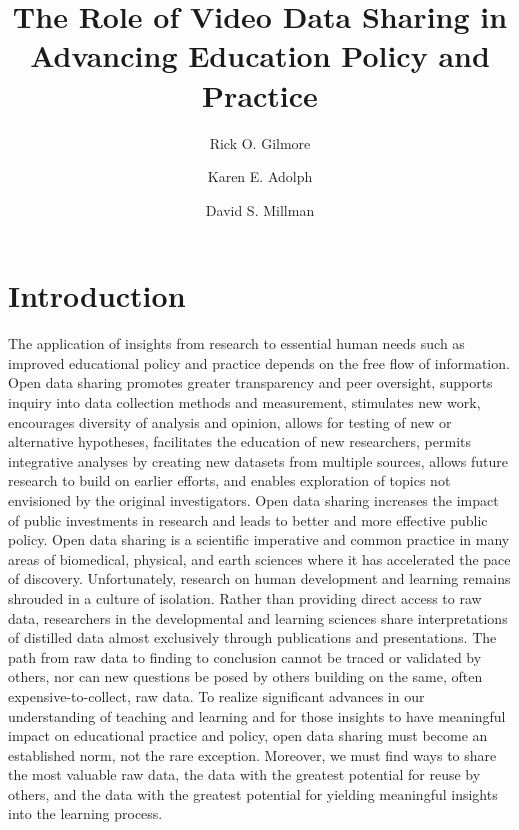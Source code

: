 \documentclass[letterpaper,man,natbib]{apa6}
\title{The Role of Video Data Sharing in Advancing Education Policy and Practice}
\author{Rick O. Gilmore}
\author{Karen E. Adolph}
\author{David S. Millman}
\affiliation{The Databrary (databrary.org) Project}
\begin{document}
\maketitle

\section{Introduction}

The application of insights from research to essential human needs such as improved educational policy and practice depends on the free flow of information. 
Open data sharing promotes greater transparency and peer oversight, supports inquiry into data collection methods and measurement, stimulates new work, encourages diversity of analysis and opinion, allows for testing of new or alternative hypotheses, facilitates the education of new researchers, permits integrative analyses by creating new datasets from multiple sources, allows future research to build on earlier efforts, and enables exploration of topics not envisioned by the original investigators. 
Open data sharing increases the impact of public investments in research and leads to better and more effective public policy.
Open data sharing is a scientific imperative and common practice in many areas of biomedical, physical, and earth sciences where it has accelerated the pace of discovery. 
Unfortunately, research on human development and learning remains shrouded in a culture of isolation. 
Rather than providing direct access to raw data, researchers in the developmental and learning sciences share interpretations of distilled data almost exclusively through publications and presentations.
The path from raw data to finding to conclusion cannot be traced or validated by others, nor can new questions be posed by others building on the same, often expensive-to-collect, raw data.
To realize significant advances in our understanding of teaching and learning and for those insights to have meaningful impact on educational practice and policy, open data sharing must become an established norm, not the rare exception.
Moreover, we must find ways to share the most valuable raw data, the data with the greatest potential for reuse by others, and the data with the greatest potential for yielding meaningful insights into the learning process.
\end{document}
